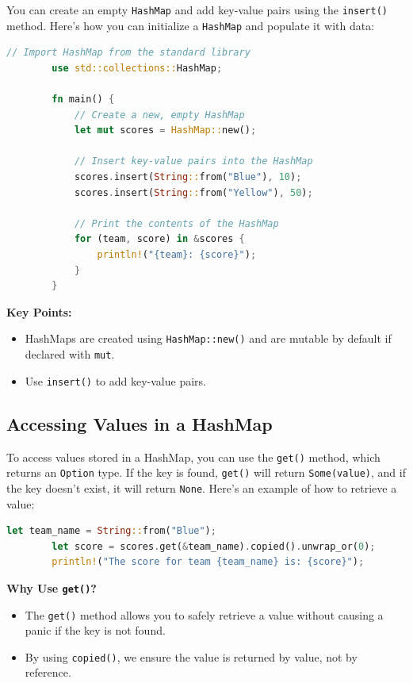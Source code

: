 \documentclass[a4paper,12pt]{report}
\begin{document}
	You can create an empty \texttt{HashMap} and add key-value pairs using the \texttt{insert()} method. Here’s how you can initialize a \texttt{HashMap} and populate it with data:
	
	\begin{lstlisting}[language=Rust]
		// Import HashMap from the standard library
		use std::collections::HashMap;
		
		fn main() {
			// Create a new, empty HashMap
			let mut scores = HashMap::new();
			
			// Insert key-value pairs into the HashMap
			scores.insert(String::from("Blue"), 10);
			scores.insert(String::from("Yellow"), 50);
			
			// Print the contents of the HashMap
			for (team, score) in &scores {
				println!("{team}: {score}");
			}
		}
	\end{lstlisting}
	
	\noindent\textbf{Key Points:}
	\begin{itemize}
		\item HashMaps are created using \texttt{HashMap::new()} and are mutable by default if declared with \texttt{mut}.
		\item Use \texttt{insert()} to add key-value pairs.
	\end{itemize}
	
	\subsection*{Accessing Values in a HashMap}
	
	To access values stored in a HashMap, you can use the \texttt{get()} method, which returns an \texttt{Option} type. If the key is found, \texttt{get()} will return \texttt{Some(value)}, and if the key doesn’t exist, it will return \texttt{None}. Here's an example of how to retrieve a value:
	
	\begin{lstlisting}[language=Rust]
		let team_name = String::from("Blue");
		let score = scores.get(&team_name).copied().unwrap_or(0);
		println!("The score for team {team_name} is: {score}");
	\end{lstlisting}
	
	\noindent\textbf{Why Use \texttt{get()}?}
	\begin{itemize}
		\item The \texttt{get()} method allows you to safely retrieve a value without causing a panic if the key is not found.
		\item By using \texttt{copied()}, we ensure the value is returned by value, not by reference.
	\end{itemize}
	
\end{document}
